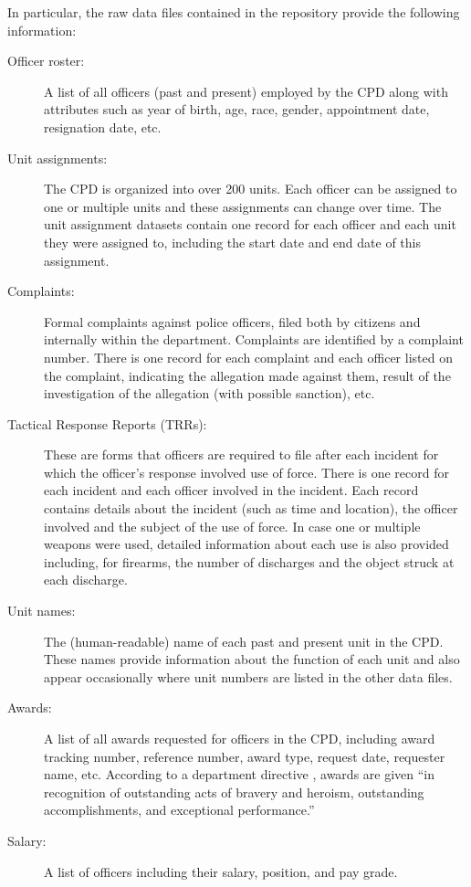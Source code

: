 In particular, the raw data files contained in the repository
provide the following information:
\begin{description}
	\item[Officer roster:] A list of all officers (past and present) employed
		by the CPD along with attributes such as year of birth, age, race,
		gender, appointment date, resignation date, etc.
	\item[Unit assignments:] The CPD is organized into over 200 units.
		Each officer can be assigned to one or multiple units and these
		assignments can change over time. The unit assignment datasets contain
		one record for each officer and each unit they were assigned to, including
		the start date and end date of this assignment.
	\item[Complaints:] Formal complaints against police officers, filed both by
		citizens and internally within the department. Complaints are
		identified by a complaint number. There is one record for each
		complaint and each officer listed on the complaint, indicating the
		allegation made against them, result of the investigation of the
		allegation (with possible sanction), etc.
	\item[Tactical Response Reports (TRRs):] These are forms that officers are
		required to file after each incident for which the officer's response
		involved use of force. There is one record for each incident and each
		officer involved in the incident. Each record contains details about
		the incident (such as time and location), the officer involved and the
		subject of the use of force. In case one or multiple weapons were used,
		detailed information about each use is also provided including, for
		firearms, the number of discharges and the object struck at each
		discharge.
	\item[Unit names:] The (human-readable) name of each past and present
		unit in the CPD. These names provide information about the function of
		each unit and also appear occasionally where unit numbers are listed in
		the other data files.
	\item[Awards:] A list of all awards requested for officers in the CPD,
		including award tracking number, reference number, award type, request
		date, requester name, etc. According to a department directive
		\cite{CPD19}, awards are given “in recognition of outstanding acts of
		bravery and heroism, outstanding accomplishments, and exceptional
		performance.”
	\item[Salary:] A list of officers including their salary, position, and pay grade.
\end{description}

